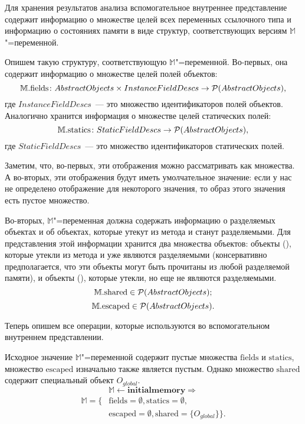 \documentclass[14pt,titlepage,draft]{extarticle}
\newcommand{\M}{\ensuremath{\mathbb{M}}}
\newcommand{\Mfield}[1]{\ensuremath{\mathrm{#1}}}
\newcommand{\op}[1]{\mathbf{#1}}
\begin{document}
      Для хранения результатов анализа вспомогательное внутреннее представление
      содержит информацию о множестве целей всех переменных ссылочного
      типа и информацию о состояниях памяти в виде структур, соответствующих
      версиям \M"=переменной.

      Опишем такую структуру, соответствующую \M"=переменной. Во-первых, она
      содержит информацию о множестве целей полей объектов:
      \[ \M.\Mfield{fields}\colon
        AbstractObjects \times InstanceFieldDescs \to
        \powerset{AbstractObjects},
      \]
      где $InstanceFieldDescs$~--- это множество идентификаторов полей
      объектов.  Аналогично хранится информация о множестве целей статических
      полей:
      \[ \M.\Mfield{statics}\colon
        StaticFieldDescs \to \powerset{AbstractObjects},
      \]
      где $StaticFieldDescs$~--- это множество идентификаторов
      статических полей.

      Заметим, что, во-первых, эти отображения можно рассматривать как
      множества.  А во-вторых, эти отображения будут иметь умолчательное
      значение: если у нас не определено отображение для некоторого значения,
      то образ этого значения есть пустое множество.

      Во-вторых, \M"=переменная должна содержать информацию о разделяемых
      объектах и об объектах, которые утекут  из метода и станут
      разделяемыми. Для представления этой информации хранится два множества
      объектов: объекты (), которые утекли из метода и уже являются
      разделяемыми (консервативно предполагается, что эти объекты могут быть
      прочитаны из любой разделяемой памяти), и объекты (),
      которые утекли, но еще не являются разделяемыми.
      \[ \M.\Mfield{shared} \in \powerset{AbstractObjects}; \]
      \[ \M.\Mfield{escaped} \in \powerset{AbstractObjects}. \]

      Теперь опишем все операции, которые используются во вспомогательном
      внутреннем представлении.

      Исходное значение \M"=переменной  содержит пустые множества
      \Mfield{fields} и \Mfield{statics}, множество \Mfield{escaped} изначально
      также является пустым. Однако множество \Mfield{shared} содержит
      специальный объект
      $O_{global}$.
      \[\M \gets \op{initialmemory }\Rightarrow \]
      \[\begin{split}
        \M = \{ &\Mfield{fields} = \emptyset, \Mfield{statics} = \emptyset, \\
        &\Mfield{escaped} = \emptyset,
        \Mfield{shared} = \{O_{global}\}
      \}.
      \end{split}\]
\end{document}
